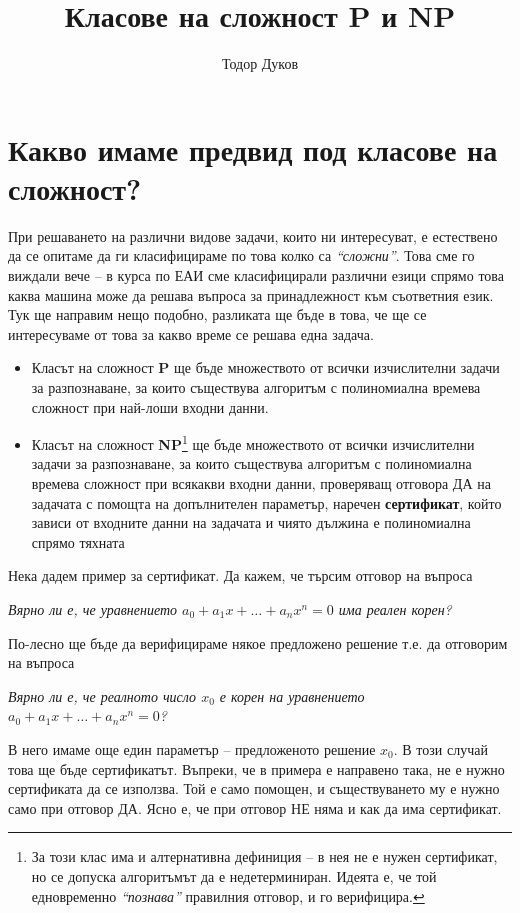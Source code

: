 \documentclass{article}
\title{Класове на сложност \textbf{P} и \textbf{NP}}
\author{Тодор Дуков}
\date{}
\theoremstyle{definition}
\theoremstyle{plain}
\theoremstyle{remark}
\theoremstyle{definition}
\begin{document}
\maketitle

\section*{Какво имаме предвид под класове на сложност?}

При решаването на различни видове задачи, които ни интересуват, е естествено да се опитаме да ги класифицираме по това колко са \textit{``сложни''}.
Това сме го виждали вече -- в курса по ЕАИ сме класифицирали различни езици спрямо това каква машина може да решава въпроса за принадлежност към съответния език.
Тук ще направим нещо подобно, разликата ще бъде в това, че ще се интересуваме от това за какво време се решава една задача.
\begin{itemize}
      \item Класът на сложност \textbf{P} ще бъде множеството от всички изчислителни задачи за разпознаване, за които съществува алгоритъм с полиномиална времева сложност при най-лоши входни данни.
      \item Класът на сложност \textbf{NP}\footnote{
                  За този клас има и алтернативна дефиниция -- в нея не е нужен сертификат, но се допуска алгоритъмът да е недетерминиран.
                  Идеята е, че той едновременно \textit{``познава''} правилния отговор, и го верифицира.
            } ще бъде множеството от всички изчислителни задачи за разпознаване, за които съществува алгоритъм с полиномиална времева сложност при всякакви входни данни, проверяващ отговора ДА на задачата с помощта на допълнителен параметър, наречен \textbf{сертификат}, който зависи от входните данни на задачата и чиято дължина е полиномиална спрямо тяхната
\end{itemize}
Нека дадем пример за сертификат.
Да кажем, че търсим отговор на въпроса
\begin{center}
      \textit{Вярно ли е, че уравнението $a_0 + a_1 x + \dots + a_n x^n = 0$ има реален корен?}
\end{center}
По-лесно ще бъде да верифицираме някое предложено решение т.е. да отговорим на въпроса
\begin{center}
      \textit{Вярно ли е, че реалното число $x_0$ е корен на уравнението $a_0 + a_1 x + \dots + a_n x^n = 0$?}
\end{center}
В него имаме още един параметър -- предложеното решение $x_0$.
В този случай това ще бъде сертификатът.
Въпреки, че в примера е направено така, не е нужно сертификата да се използва.
Той е само помощен, и съществуването му е нужно само при отговор ДА.
Ясно е, че при отговор НЕ няма и как да има сертификат.
\end{document}

